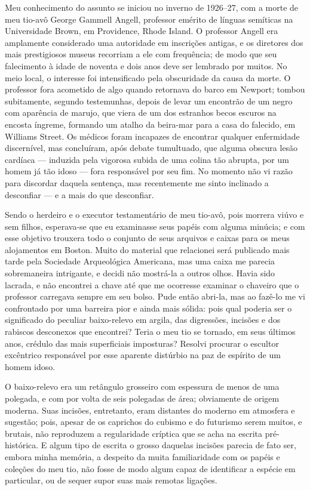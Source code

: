 Meu conhecimento do assunto se iniciou no inverno de 1926--27, com a
morte de meu tio-avô George Gammell Angell, professor emérito de línguas
semíticas na Universidade Brown, em Providence, Rhode Island. O
professor Angell era amplamente considerado uma autoridade em inscrições
antigas, e os diretores dos mais prestigiosos museus recorriam a ele com
frequência; de modo que seu falecimento à idade de noventa e dois anos
deve ser lembrado por muitos. No meio local, o interesse foi
intensificado pela obscuridade da causa da morte. O professor fora
acometido de algo quando retornava do barco em Newport; tombou
subitamente, segundo testemunhas, depois de levar um encontrão de um
negro com aparência de marujo, que viera de um dos estranhos becos
escuros na encosta íngreme, formando um atalho da beira-mar para a casa
do falecido, em Williams Street. Os médicos foram incapazes de encontrar
qualquer enfermidade discernível, mas concluíram, após debate
tumultuado, que alguma obscura lesão cardíaca --- induzida pela vigorosa
subida de uma colina tão abrupta, por um homem já tão idoso --- fora
responsável por seu fim. No momento não vi razão para discordar daquela
sentença, mas recentemente me sinto inclinado a desconfiar --- e a mais 
do que desconfiar. 


Sendo o herdeiro e o executor testamentário de meu tio-avô, pois morrera
viúvo e sem filhos, esperava-se que eu examinasse seus papéis com alguma
minúcia; e com esse objetivo trouxera todo o conjunto de seus arquivos e
caixas para os meus alojamentos em Boston. Muito do material que
relacionei será publicado mais tarde pela Sociedade Arqueológica
Americana, mas uma caixa me parecia sobremaneira intrigante, e decidi
não mostrá-la a outros olhos. Havia sido lacrada, e não encontrei a
chave até que me ocorresse examinar o chaveiro que o professor carregava
sempre em seu bolso. Pude então abri-la, mas ao fazê-lo me vi
confrontado por uma barreira pior e ainda mais sólida: pois qual poderia
ser o significado do peculiar baixo-relevo em argila, das digressões,
incisões e dos rabiscos desconexos que encontrei? Teria o meu tio se
tornado, em seus últimos anos, crédulo das mais superficiais imposturas?
Resolvi procurar o escultor excêntrico responsável por esse aparente
distúrbio na paz de espírito de um homem idoso.

O baixo-relevo era um retângulo grosseiro com espessura de menos de uma
polegada, e com por volta de seis polegadas de área; obviamente de
origem moderna. Suas incisões, entretanto, eram distantes do moderno em
atmosfera e sugestão; pois, apesar de os caprichos do cubismo e do
futurismo serem muitos, e brutais, não reproduzem a regularidade
críptica que se acha na escrita pré-histórica. E algum tipo de escrita o
grosso daquelas incisões parecia de fato ser, embora minha memória, a
despeito da muita familiaridade com os papéis e coleções do meu tio, não
fosse de modo algum capaz de identificar a espécie em particular, ou
de sequer supor suas mais remotas ligações.

